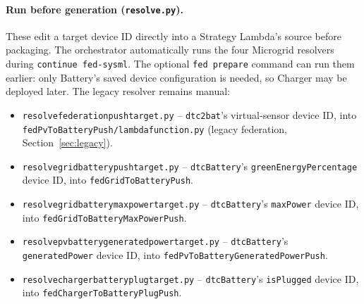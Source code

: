 \documentclass[11pt]{article}
\renewcommand{\_}{\textunderscore\allowbreak}
\begin{document}
\paragraph{Run before generation (\texttt{resolve\_*.py}).}
These edit a target device ID directly into a Strategy Lambda's source
before packaging. The orchestrator automatically runs the four Microgrid
resolvers during \texttt{continue fed-sysml}. The optional \texttt{fed prepare}
command can run them earlier: only Battery's saved device configuration is
needed, so Charger may be deployed later. The legacy resolver remains manual:
\begin{itemize}[nosep]
  \item \texttt{resolve\_federation\_push\_target.py} -- \texttt{dtc2bat}'s
        virtual-sensor device ID, into
        \texttt{fedPvToBatteryPush/lambda\_function.py} (legacy federation,
        Section~\ref{sec:legacy}).
  \item \texttt{resolve\_grid\_battery\_push\_target.py} -- \texttt{dtcBattery}'s
        \texttt{greenEnergyPercentage} device ID, into
        \texttt{fedGridToBatteryPush}.
  \item \texttt{resolve\_grid\_battery\_maxpower\_target.py} --
        \texttt{dtcBattery}'s \texttt{maxPower} device ID, into
        \texttt{fedGridToBatteryMaxPowerPush}.
  \item \texttt{resolve\_pv\_battery\_generatedpower\_target.py} --
        \texttt{dtcBattery}'s \texttt{generatedPower} device ID, into
        \texttt{fedPvToBatteryGeneratedPowerPush}.
  \item \texttt{resolve\_charger\_battery\_plug\_target.py} --
        \texttt{dtcBattery}'s \texttt{isPlugged} device ID, into
        \texttt{fedChargerToBatteryPlugPush}.
\end{itemize}
\end{document}
